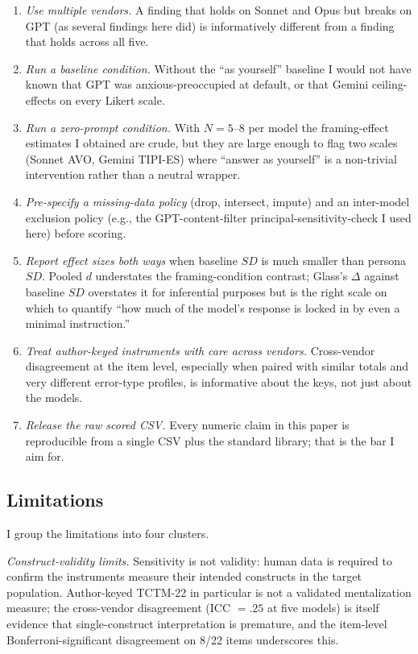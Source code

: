 \documentclass[11pt,a4paper]{article}
\begin{document}
\begin{enumerate}
\item \emph{Use multiple vendors.} A finding that holds on Sonnet and Opus but breaks on GPT (as several findings here did) is informatively different from a finding that holds across all five.
\item \emph{Run a baseline condition.} Without the ``as yourself'' baseline I would not have known that GPT was anxious-preoccupied at default, or that Gemini ceiling-effects on every Likert scale.
\item \emph{Run a zero-prompt condition.} With $N = 5$--$8$ per model the framing-effect estimates I obtained are crude, but they are large enough to flag two scales (Sonnet AVO, Gemini TIPI-ES) where ``answer as yourself'' is a non-trivial intervention rather than a neutral wrapper.
\item \emph{Pre-specify a missing-data policy} (drop, intersect, impute) and an inter-model exclusion policy (e.g., the GPT-content-filter principal-sensitivity-check I used here) before scoring.
\item \emph{Report effect sizes both ways} when baseline $SD$ is much smaller than persona $SD$. Pooled $d$ understates the framing-condition contrast; Glass's $\Delta$ against baseline $SD$ overstates it for inferential purposes but is the right scale on which to quantify ``how much of the model's response is locked in by even a minimal instruction.''
\item \emph{Treat author-keyed instruments with care across vendors.} Cross-vendor disagreement at the item level, especially when paired with similar totals and very different error-type profiles, is informative about the keys, not just about the models.
\item \emph{Release the raw scored CSV.} Every numeric claim in this paper is reproducible from a single CSV plus the standard library; that is the bar I aim for.
\end{enumerate}

\subsection{Limitations}

I group the limitations into four clusters.

\emph{Construct-validity limits.} Sensitivity is not validity: human data is required to confirm the instruments measure their intended constructs in the target population. Author-keyed TCTM-22 in particular is not a validated mentalization measure; the cross-vendor disagreement (ICC $= .25$ at five models) is itself evidence that single-construct interpretation is premature, and the item-level Bonferroni-significant disagreement on 8/22 items underscores this.
\end{document}
